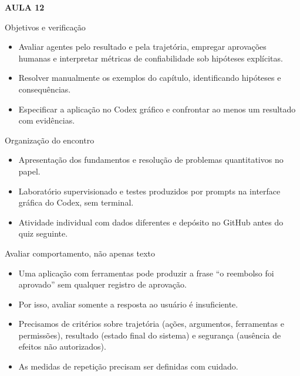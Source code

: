\documentclass[10pt,aspectratio=169]{beamer}
\begin{document}
\begin{frame}[t]{}
\vspace{14mm}\textcolor{InsperRed}{\bfseries AULA 12}\par\vspace{4mm}{\LARGE\bfseries Confiabilidade e segurança de agentes}\par\vspace{6mm}{\large Operações empresariais}\par{}
\end{frame}

\begin{frame}[t]{Objetivos e verificação}
\small
\begin{itemize}
\item Avaliar agentes pelo resultado e pela trajetória, empregar aprovações humanas e interpretar métricas de confiabilidade sob hipóteses explícitas.
\item Resolver manualmente os exemplos do capítulo, identificando hipóteses e consequências.
\item Especificar a aplicação no Codex gráfico e confrontar ao menos um resultado com evidências.
\end{itemize}
\end{frame}

\begin{frame}[t]{Organização do encontro}
\small
\begin{itemize}
\item Apresentação dos fundamentos e resolução de problemas quantitativos no papel.
\item Laboratório supervisionado e testes produzidos por prompts na interface gráfica do Codex, sem terminal.
\item Atividade individual com dados diferentes e depósito no GitHub antes do quiz seguinte.
\end{itemize}
\end{frame}

\begin{frame}[t]{Avaliar comportamento, não apenas texto}
\small
\begin{itemize}
\item Uma aplicação com ferramentas pode produzir a frase ``o reembolso foi aprovado'' sem qualquer registro de aprovação.
\item Por isso, avaliar somente a resposta ao usuário é insuficiente.
\item Precisamos de critérios sobre trajetória (ações, argumentos, ferramentas e permissões), resultado (estado final do sistema) e segurança (ausência de efeitos não autorizados).
\item As medidas de repetição precisam ser definidas com cuidado.
\end{itemize}
\end{frame}
\end{document}
